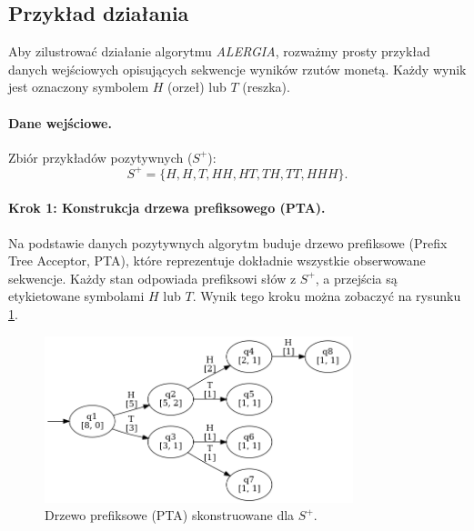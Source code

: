 


\subsection{Przykład działania}  
Aby zilustrować działanie algorytmu \textit{ALERGIA}, rozważmy prosty przykład danych wejściowych opisujących sekwencje wyników rzutów monetą. Każdy wynik jest oznaczony symbolem \( H \) (orzeł) lub \( T \) (reszka).

\paragraph*{Dane wejściowe.}  
Zbiór przykładów pozytywnych (\( S^+ \)):  
\[
S^+ = \{H, H, T, HH, HT, TH, TT, HHH\}.
\]  

\paragraph*{Krok 1: Konstrukcja drzewa prefiksowego (PTA).}  
Na podstawie danych pozytywnych algorytm buduje drzewo prefiksowe (Prefix Tree Acceptor, PTA), które reprezentuje dokładnie wszystkie obserwowane sekwencje. Każdy stan odpowiada prefiksowi słów z \( S^+ \), a przejścia są etykietowane symbolami \( H \) lub \( T \). Wynik tego kroku można zobaczyć na rysunku \ref{fig:alergia_example_0}. 

\begin{figure}[ht]
    \centering
    \includegraphics[width=0.8\textwidth]{images/run_example/alergia/0.png}
    \caption{Drzewo prefiksowe (PTA) skonstruowane dla \( S^+ \).}
    \label{fig:alergia_example_0}
\end{figure}

